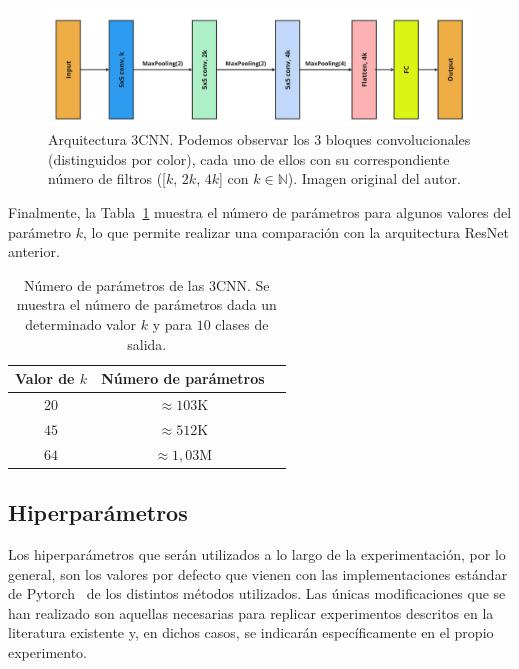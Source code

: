 \begin{figure}[h]
    \centering
    \includegraphics[width=\linewidth]{img/experiments/3CNN.png}
    \caption[Arquitectura $3$CNN.]{Arquitectura $3$CNN. Podemos observar los 3 bloques convolucionales (distinguidos por color), cada uno de ellos con su correspondiente número de filtros ([$k$, $2k$, $4k$] con $k \in \mathbb{N}$). Imagen original del autor.}\label{fig:3CNN}
\end{figure}

Finalmente, la Tabla~\ref{tab:numero-parametros3cnn} muestra el número de parámetros para algunos valores del parámetro $k$, lo que permite realizar una comparación con la arquitectura ResNet anterior.

\begin{table}[ht]
    \centering
    \begin{tabular}{|c|c|c|}
    \hline
    \textbf{Valor de $k$}           & \textbf{Número de parámetros}                     
    \\ \hline
    $20$                  & $\approx 103$\space K                                            \\ \hline
    $45$                  & $\approx 512$\space K                                             \\ \hline
    $64$                  & $\approx 1,03$\space M                                             \\ \hline
    \end{tabular}
    \caption[Número de parámetros de las arquitecturas $3$CNN.]{Número de parámetros de las $3$CNN. Se muestra el número de parámetros dada un determinado valor $k$ y para $10$ clases de salida.}\label{tab:numero-parametros3cnn}
\end{table}

\subsection{Hiperparámetros}\label{subsec:hiperparametros}

Los hiperparámetros que serán utilizados a lo largo de la experimentación, por lo general, son los valores por defecto que vienen con las implementaciones estándar de Pytorch~\cite{NEURIPS2019_9015} de los distintos métodos utilizados. Las únicas modificaciones que se han realizado son aquellas necesarias para replicar experimentos descritos en la literatura existente y, en dichos casos, se indicarán específicamente en el propio experimento.\newline

